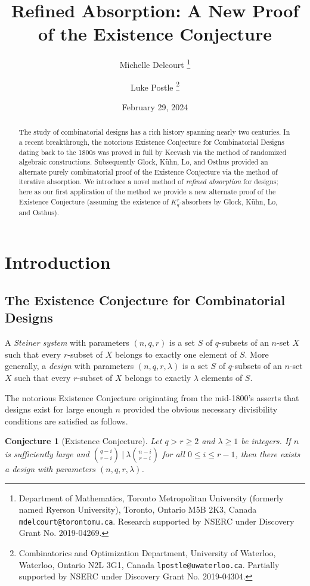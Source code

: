 \documentclass[11pt]{article}
\title{Refined Absorption: A New Proof of the Existence Conjecture}
\author{
Michelle Delcourt
\thanks{Department of Mathematics, Toronto Metropolitan University (formerly named Ryerson University),
Toronto, Ontario M5B 2K3, Canada {\tt mdelcourt@torontomu.ca}. Research supported by NSERC under Discovery Grant No. 2019-04269.}
\and
Luke Postle
\thanks{Combinatorics and Optimization Department,
University of Waterloo, Waterloo, Ontario N2L 3G1, Canada {\tt lpostle@uwaterloo.ca}. Partially supported by NSERC
under Discovery Grant No. 2019-04304.}}
\date{February 29, 2024}
\newcounter{i}
\theoremstyle{plain}
\newtheorem{conj}[thm]{Conjecture}
\theoremstyle{plain} %
\theoremstyle{definition}
\begin{document}
\maketitle

\begin{abstract} 
The study of combinatorial designs has a rich history spanning nearly two centuries.  In a recent breakthrough, the notorious Existence Conjecture for Combinatorial Designs dating back to the 1800s was proved in full by Keevash via the method of randomized algebraic constructions. Subsequently Glock, K\"{u}hn, Lo, and Osthus provided an alternate purely combinatorial proof of the Existence Conjecture via the method of iterative absorption.  We introduce a novel method of \emph{refined absorption} for designs; here as our first application of the method we provide a new alternate proof of the Existence Conjecture (assuming the existence of $K_q^r$-absorbers by Glock, K\"{u}hn, Lo, and Osthus). 
\end{abstract}

\section{Introduction}



\subsection{The Existence Conjecture for Combinatorial Designs}

A \emph{Steiner system} with parameters $(n,q,r)$ is a set $S$ of $q$-subsets of an $n$-set $X$ such that every $r$-subset of $X$ belongs to exactly one element of $S$. More generally, a \emph{design} with parameters $(n,q,r,\lambda)$ is a set $S$ of $q$-subsets of an $n$-set $X$ such that every $r$-subset of $X$ belongs to exactly $\lambda$ elements of $S$. 

The notorious Existence Conjecture originating from the mid-1800's asserts that designs exist for large enough $n$ provided the obvious necessary divisibility conditions are satisfied as follows.

\begin{conj}[Existence Conjecture]\label{conj:Existence}
Let $q > r \ge 2$ and $\lambda \geq 1$ be integers. If $n$ is sufficiently large and $\binom{q-i}{r-i}~|~\lambda \binom{n-i}{r-i}$ for all $0\le i \le r-1$, then there exists a design with parameters $(n,q,r,\lambda)$.
\end{conj}
\end{document}
